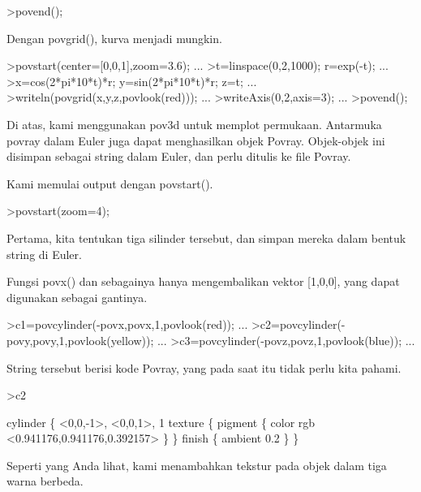 \documentclass[a4paper,10pt]{article}
\begin{document}
\begin{eulernotebook}
\begin{eulercomment}
\begin{eulercomment}
\begin{eulerprompt}
>povend();
\end{eulerprompt}
\begin{eulercomment}
Dengan povgrid(), kurva menjadi mungkin.
\end{eulercomment}
\begin{eulerprompt}
>povstart(center=[0,0,1],zoom=3.6); ...
>t=linspace(0,2,1000); r=exp(-t); ...
>x=cos(2*pi*10*t)*r; y=sin(2*pi*10*t)*r; z=t; ...
>writeln(povgrid(x,y,z,povlook(red))); ...
>writeAxis(0,2,axis=3); ...
>povend();
\end{eulerprompt}
\begin{eulercomment}
Di atas, kami menggunakan pov3d untuk memplot permukaan. Antarmuka
povray dalam Euler juga dapat menghasilkan objek Povray. Objek-objek
ini disimpan sebagai string dalam Euler, dan perlu ditulis ke file
Povray.

Kami memulai output dengan povstart().
\end{eulercomment}
\begin{eulerprompt}
>povstart(zoom=4);
\end{eulerprompt}
\begin{eulercomment}
Pertama, kita tentukan tiga silinder tersebut, dan simpan mereka dalam
bentuk string di Euler.

Fungsi povx() dan sebagainya hanya mengembalikan vektor [1,0,0], yang
dapat digunakan sebagai gantinya.
\end{eulercomment}
\begin{eulerprompt}
>c1=povcylinder(-povx,povx,1,povlook(red)); ...
>c2=povcylinder(-povy,povy,1,povlook(yellow)); ...
>c3=povcylinder(-povz,povz,1,povlook(blue)); ...
\end{eulerprompt}
\begin{eulercomment}
String tersebut berisi kode Povray, yang pada saat itu tidak perlu
kita pahami.
\end{eulercomment}
\begin{eulerprompt}
>c2
\end{eulerprompt}
\begin{euleroutput}
  cylinder \{ <0,0,-1>, <0,0,1>, 1
   texture \{ pigment \{ color rgb <0.941176,0.941176,0.392157> \}  \} 
   finish \{ ambient 0.2 \} 
   \}
\end{euleroutput}
\begin{eulercomment}
Seperti yang Anda lihat, kami menambahkan tekstur pada objek dalam
tiga warna berbeda.


\end{eulercomment}
\end{eulercomment}
\end{eulercomment}
\end{eulernotebook}
\end{document}
